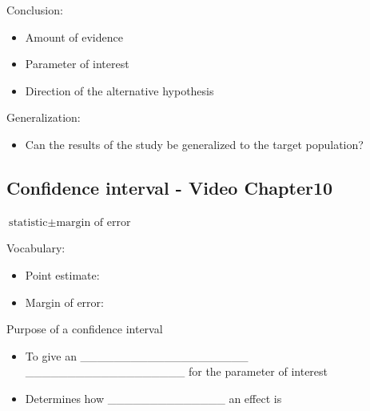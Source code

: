 \documentclass[
]{report}
\providecommand{\tightlist}{%
  \setlength{\itemsep}{0pt}\setlength{\parskip}{0pt}}
\newcommand{\rgi}{\hspace{24pt}}  %
\begin{document}
\vspace{0.8in}

\newpage

Conclusion:

\begin{itemize}
\item
  Amount of evidence
\item
  Parameter of interest
\item
  Direction of the alternative hypothesis
\end{itemize}

\vspace{0.6in}

Generalization:

\begin{itemize}
\tightlist
\item
  Can the results of the study be generalized to the target population?
\end{itemize}

\vspace{0.4in}

\subsection*{Confidence interval - Video Chapter10}\label{confidence-interval---video-chapter10}

\rgi \(\text{statistic} \pm \text{margin of error}\)

Vocabulary:

\begin{itemize}
\tightlist
\item
  Point estimate:
\end{itemize}

\vspace{0.3in}

\begin{itemize}
\tightlist
\item
  Margin of error:
\end{itemize}

\vspace{0.3in}


Purpose of a confidence interval

\begin{itemize}
\item
  To give an \_\_\_\_\_\_\_\_\_\_\_\_\_\_\_\_\_\_\_\_ \_\_\_\_\_\_\_\_\_\_\_\_\_\_\_\_\_\_\_ for the parameter of interest
\item
  Determines how \_\_\_\_\_\_\_\_\_\_\_\_\_\_ an effect is
\end{itemize}
\end{document}
